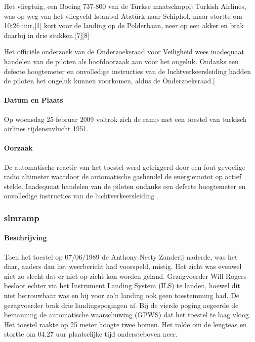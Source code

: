\documentclass{article}
\begin{document}
	Het vliegtuig, een Boeing 737-800 van de Turkse maatschappij Turkish Airlines, was op weg van het vliegveld Istanbul Atatürk naar Schiphol, maar stortte om 10:26 uur,[1] kort voor de landing op de Polderbaan, neer op een akker en brak daarbij in drie stukken.[7][8]
	
	Het officiële onderzoek van de Onderzoeksraad voor Veiligheid wees inadequaat handelen van de piloten als hoofdoorzaak aan voor het ongeluk. Ondanks een defecte hoogtemeter en onvolledige instructies van de luchtverkeersleiding hadden de piloten het ongeluk kunnen voorkomen, aldus de Onderzoeksraad.[
	\paragraph{Datum en Plaats}
 
	\newline \indent  Op woensdag 25 februar 2009 voltrok zich de  ramp met een toestel van turkisch airlines tijdensnvlucht 1951.
	\paragraph{Oorzaak}
	De automatische reactie van het toestel werd getriggerd door een fout gevoelige radio altimeter waardoor de automatische gashendel de energiemotot op actief stelde.
	Inadequaat handelen van de piloten ondanks een defecte hoogtemeter en onvolledige instructies van de luchtverkeersleiding
	\cite{zuilen23022019Tijdlijnpoldercrash}
	\cite{wikinews04032009techfoutailines1951}
	\cite{luchtvaartnieuws21012020boeing737conclusies}
	\cite{adformatie280220209communicatiegebreken}
	\cite{spinnael25022009onderzoekpolderbaancrash}
	\cite{crashTurkishAirlines}
	\cite{flightradar24}
	\cite{flightstatstracker}. 
	\subsubsection{slmramp}
			\paragraph{Beschrijving}
				Toen het toestel op 07/06/1989 de Anthony Nesty Zanderij naderde, was het daar, anders dan het weerbericht had voorspeld, mistig. Het zicht was evenwel niet zo slecht dat er niet op zicht kon worden geland. Gezagvoerder Will Rogers besloot echter via het Instrument Landing System (ILS) te landen, hoewel dit niet betrouwbaar was en hij voor zo'n landing ook geen toestemming had. De gezagvoerder brak drie landingspogingen af. Bij de vierde poging negeerde de bemanning de automatische waarschuwing (GPWS) dat het toestel te laag vloog. Het toestel raakte op 25 meter hoogte twee bomen. Het rolde om de lengteas en stortte om 04.27 uur plaatselijke tijd ondersteboven neer.
\end{document}
